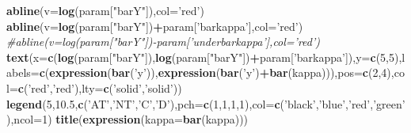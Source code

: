 \documentclass[]{book}
\newenvironment{Shaded}{\begin{snugshade}}{\end{snugshade}}
\newcommand{\CommentTok}[1]{\textcolor[rgb]{0.56,0.35,0.01}{\textit{#1}}}
\newcommand{\DataTypeTok}[1]{\textcolor[rgb]{0.13,0.29,0.53}{#1}}
\newcommand{\DecValTok}[1]{\textcolor[rgb]{0.00,0.00,0.81}{#1}}
\newcommand{\FloatTok}[1]{\textcolor[rgb]{0.00,0.00,0.81}{#1}}
\newcommand{\KeywordTok}[1]{\textcolor[rgb]{0.13,0.29,0.53}{\textbf{#1}}}
\newcommand{\NormalTok}[1]{#1}
\newcommand{\OperatorTok}[1]{\textcolor[rgb]{0.81,0.36,0.00}{\textbf{#1}}}
\newcommand{\StringTok}[1]{\textcolor[rgb]{0.31,0.60,0.02}{#1}}
\theoremstyle{definition}
\theoremstyle{definition}
\theoremstyle{definition}
\theoremstyle{remark}
\begin{document}
\begin{Shaded}
\begin{Highlighting}[]
\KeywordTok{abline}\NormalTok{(}\DataTypeTok{v=}\KeywordTok{log}\NormalTok{(param[}\StringTok{"barY"}\NormalTok{]),}\DataTypeTok{col=}\StringTok{'red'}\NormalTok{)}
\KeywordTok{abline}\NormalTok{(}\DataTypeTok{v=}\KeywordTok{log}\NormalTok{(param[}\StringTok{"barY"}\NormalTok{])}\OperatorTok{+}\NormalTok{param[}\StringTok{'barkappa'}\NormalTok{],}\DataTypeTok{col=}\StringTok{'red'}\NormalTok{)}
\CommentTok{#abline(v=log(param["barY"])-param['underbarkappa'],col='red')}
\KeywordTok{text}\NormalTok{(}\DataTypeTok{x=}\KeywordTok{c}\NormalTok{(}\KeywordTok{log}\NormalTok{(param[}\StringTok{"barY"}\NormalTok{]),}\KeywordTok{log}\NormalTok{(param[}\StringTok{"barY"}\NormalTok{])}\OperatorTok{+}\NormalTok{param[}\StringTok{'barkappa'}\NormalTok{]),}\DataTypeTok{y=}\KeywordTok{c}\NormalTok{(}\DecValTok{5}\NormalTok{,}\DecValTok{5}\NormalTok{),}\DataTypeTok{labels=}\KeywordTok{c}\NormalTok{(}\KeywordTok{expression}\NormalTok{(}\KeywordTok{bar}\NormalTok{(}\StringTok{'y'}\NormalTok{)),}\KeywordTok{expression}\NormalTok{(}\KeywordTok{bar}\NormalTok{(}\StringTok{'y'}\NormalTok{)}\OperatorTok{+}\KeywordTok{bar}\NormalTok{(kappa))),}\DataTypeTok{pos=}\KeywordTok{c}\NormalTok{(}\DecValTok{2}\NormalTok{,}\DecValTok{4}\NormalTok{),}\DataTypeTok{col=}\KeywordTok{c}\NormalTok{(}\StringTok{'red'}\NormalTok{,}\StringTok{'red'}\NormalTok{),}\DataTypeTok{lty=}\KeywordTok{c}\NormalTok{(}\StringTok{'solid'}\NormalTok{,}\StringTok{'solid'}\NormalTok{))}
\KeywordTok{legend}\NormalTok{(}\DecValTok{5}\NormalTok{,}\FloatTok{10.5}\NormalTok{,}\KeywordTok{c}\NormalTok{(}\StringTok{'AT'}\NormalTok{,}\StringTok{'NT'}\NormalTok{,}\StringTok{'C'}\NormalTok{,}\StringTok{'D'}\NormalTok{),}\DataTypeTok{pch=}\KeywordTok{c}\NormalTok{(}\DecValTok{1}\NormalTok{,}\DecValTok{1}\NormalTok{,}\DecValTok{1}\NormalTok{,}\DecValTok{1}\NormalTok{),}\DataTypeTok{col=}\KeywordTok{c}\NormalTok{(}\StringTok{'black'}\NormalTok{,}\StringTok{'blue'}\NormalTok{,}\StringTok{'red'}\NormalTok{,}\StringTok{'green'}\NormalTok{),}\DataTypeTok{ncol=}\DecValTok{1}\NormalTok{)}
\KeywordTok{title}\NormalTok{(}\KeywordTok{expression}\NormalTok{(}\DataTypeTok{kappa=}\KeywordTok{bar}\NormalTok{(kappa)))}


\end{Highlighting}
\end{Shaded}
\end{document}
